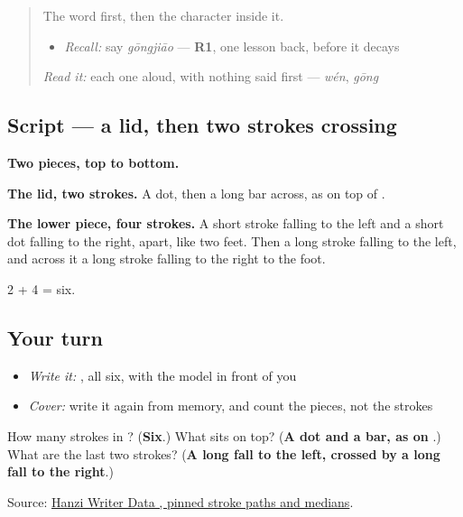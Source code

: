 \begin{quote}
The word first, then the character inside it.

\begin{itemize}
\raggedright
  \item \emph{Recall:} say \emph{gōngjiāo} — \textbf{R1}, one lesson back, before it decays
\end{itemize}

\begin{quote}
 
\end{quote}

\emph{Read it:} each one aloud, with nothing said first — \emph{wén}, \emph{gōng}
\end{quote}

\subsection*{Script — a lid, then two strokes crossing}

\begin{quote}
\end{quote}

\textbf{Two pieces, top to bottom.}

\textbf{The lid, two strokes.} A dot, then a long bar across, as on top of .

\textbf{The lower piece, four strokes.} A short stroke falling to the left and a short dot falling to the right, apart, like two feet. Then a long stroke falling to the left, and across it a long stroke falling to the right to the foot.

2 + 4 = six.

\subsection*{Your turn}
\begin{itemize}
\raggedright
  \item \emph{Write it:} , all six, with the model in front of you
  \item \emph{Cover:} write it again from memory, and count the pieces, not the strokes
\end{itemize}

\begin{tcolorbox}[breakable,colback=teal!4,colframe=teal!35!black,title={Before you move on}]
How many strokes in ? (\textbf{Six}.) What sits on top? (\textbf{A dot and a bar, as on }.) What are the last two strokes? (\textbf{A long fall to the left, crossed by a long fall to the right}.)

Source: \href{https://raw.githubusercontent.com/chanind/hanzi-writer-data/68d10a4b21150cae5e1ebbd223eed289cf32d90c/data/\%E4\%BA\%A4.json}{Hanzi Writer Data , pinned stroke paths and medians}.
\end{tcolorbox}

